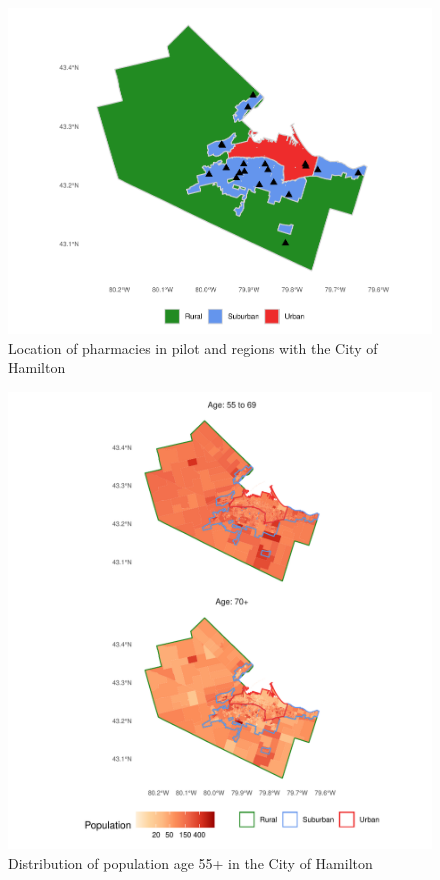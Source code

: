 \documentclass[]{elsarticle} %
\begin{document}
\begin{figure}

{\centering \includegraphics{Accessibility-Vaccination-Sites-Hamilton_files/figure-latex/pharmacies-map-1} 

}

\caption{\label{fig:pharmacies-and-regions}Location of pharmacies in pilot and regions with the City of Hamilton}\label{fig:pharmacies-map}
\end{figure}

\begin{figure}

{\centering \includegraphics{Accessibility-Vaccination-Sites-Hamilton_files/figure-latex/population-map-1} 

}

\caption{\label{fig:population-map}Distribution of population age 55+ in the City of Hamilton}\label{fig:population-map}
\end{figure}
\end{document}
